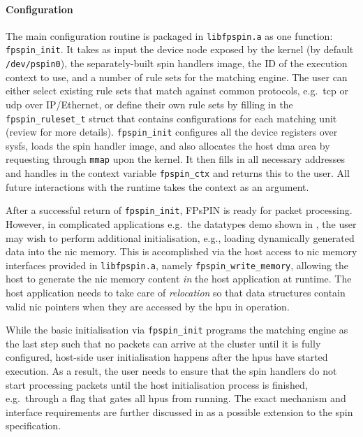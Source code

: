 \paragraph{Configuration} The main configuration routine is packaged in \texttt{libfpspin.a} as one function: \texttt{fpspin\_init}.  It takes as input the device node exposed by the kernel (by default \texttt{/dev/pspin0}), the separately-built \ac{spin} handlers image, the ID of the execution context to use, and a number of rule sets for the matching engine.  The user can either select existing rule sets that match against common protocols, e.g.\ \ac{tcp} or \ac{udp} over IP/Ethernet, or define their own rule sets by filling in the \texttt{fpspin\_\-ruleset\_\-t} struct that contains configurations for each matching unit (review  for more details).  \texttt{fpspin\_init} configures all the device registers over sysfs, loads the \ac{spin} handler image, and also allocates the host \ac{dma} area by requesting through \texttt{mmap} upon the kernel.  It then fills in all necessary addresses and handles in the context variable \texttt{fpspin\_\-ctx} and returns this to the user.  All future interactions with the runtime takes the context as an argument.

After a successful return of \texttt{fpspin\_\-init}, FPsPIN is ready for packet processing.  However, in complicated applications e.g.\ the datatypes demo shown in ,  the user may wish to perform additional initialisation, e.g., loading dynamically generated data into the \ac{nic} memory.  This is accomplished via the host access to \ac{nic} memory interfaces provided in \texttt{libfpspin.a}, namely \texttt{fpspin\_write\_memory}, allowing the host to generate the \ac{nic} memory content \emph{in} the host application at runtime.  The host application needs to take care of \emph{relocation} so that data structures contain valid \ac{nic} pointers when they are accessed by the \ac{hpu} in operation.

While the basic initialisation via \texttt{fpspin\_\-init} programs the matching engine as the last step such that no packets can arrive at the cluster until it is fully configured, host-side user initialisation happens after the \ac{hpu}s have started execution.  As a result, the user needs to ensure that the \ac{spin} handlers do not start processing packets until the host initialisation process is finished, e.g.\ through a flag that gates all \ac{hpu}s from running.  The exact mechanism and interface requirements are further discussed in  as a possible extension to the \ac{spin} specification.

